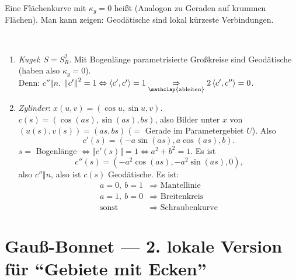 \begin{definition}[Geodätische]
  Eine Flächenkurve mit \( \kappa_g = 0 \) heißt \label{def:geodaetische} (Analogon zu Geraden auf krummen Flächen). Man kann zeigen: Geodätische sind lokal kürzeste Verbindungen.
\end{definition}

\begin{example}[Geodätische]
  \
  \begin{enumerate}
    \item \emph{Kugel}: \( S = S_R^2 \). Mit Bogenlänge parametrisierte Großkreise sind Geodätische (haben also \( \kappa_g = 0 \)). \\
      Denn: \( c'' \Vert n \). \( \left\Vert c' \right\Vert^2 = 1 \Leftrightarrow \left\langle c', c' \right\rangle = 1 \underset{\mathclap{\text{ableiten}}}{\Rightarrow} 2\left\langle c', c'' \right\rangle = 0 \).
    
    \item \emph{Zylinder}: \( x(u,v) = \left( \cos u, \sin u, v \right) \). \\
      \( c(s) = \left( \cos(as),\sin(as),bs \right) \), also Bilder unter \( x \) von \( \left( u(s), v(s) \right) = (as, bs) \) (\( = \) Gerade im Parametergebiet \( U \)). Also
      \begin{equation*}
        c'(s) = \left( -a\sin (as), a\cos(as), b \right)\text{.}
      \end{equation*}
      \( s = \) Bogenlänge \( \Leftrightarrow \left\Vert c'(s) \right\Vert = 1 \Leftrightarrow a^2+b^2= 1 \). Es ist
      \begin{equation*}
        c''(s) = \left( -a^2\cos(as), -a^2\sin(as),0 \right)\text{,}
      \end{equation*}
      also \( c'' \Vert n \), also ist \( c(s) \) Geodätische. Es ist:
      \begin{align*}
        a = 0, \ b = 1 &\Rightarrow \text{ Mantellinie} \\
        a = 1, \ b = 0 &\Rightarrow \text{ Breitenkreis} \\
        \text{sonst } &\Rightarrow \text{ Schraubenkurve}
      \end{align*}
  \end{enumerate}
\end{example}

\section{Gauß-Bonnet --- 2. lokale Version für ``Gebiete mit Ecken''}

